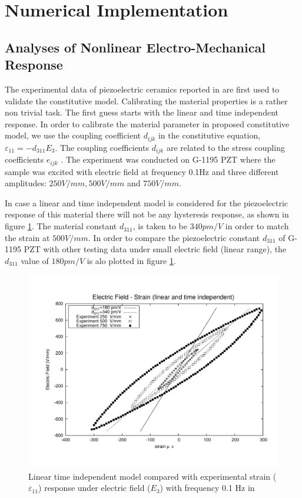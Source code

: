 \section{Numerical Implementation}
\subsection{Analyses of Nonlinear Electro-Mechanical Response}
The experimental data of piezoelectric ceramics reported in \cite{Crawley1990} are first used to validate the constitutive model.
Calibrating the material properties is a rather non trivial task.
The first guess starts with the linear and time independent response.
In order to calibrate the material parameter in proposed constitutive model, we use the coupling coefficient $d_{ijk}$ in the constitutive equation, $\varepsilon_{11}=-d_{311}E_3$. 
The coupling coefficients $d_{ijk}$ are related to the stress coupling coefficients $e_{ijk}$ \cite{Leo2007}. 
The experiment was conducted on G-1195 PZT where the sample was excited with electric field at frequency 0.1Hz and three different amplitudes: $250 V/mm, 500 V/mm$ and $750 V/mm$.


In case a linear and time independent model is considered for the piezoelectric response of this material there will not be any hysteresis response, as shown in figure \ref{fig:Crawley_xp_TimeinDepenLin}. 
The material constant $d_{311}$, is taken to be $340 pm/V$ in order to match the strain at $500 V/mm$. 
In order to compare the piezoelectric constant $d_{311}$ of G-1195 PZT with other testing data under small electric field (linear range), the $d_{311}$ value of $180 pm/V$ \cite{low1995modeling} is alo plotted in figure \ref{fig:Crawley_xp_TimeinDepenLin}.

\begin{figure} 
\centering 
\includegraphics[width=5.0in]{./chap_3_minor_loop/figures/crawley_linear_time_independent.pdf}
\caption{Linear time independent model compared with experimental strain ($\varepsilon_{11}$) response under electric field ($E_3$) with frequency 0.1 Hz in \cite{Crawley1990}}
\label{fig:Crawley_xp_TimeinDepenLin}
\end{figure}
 
